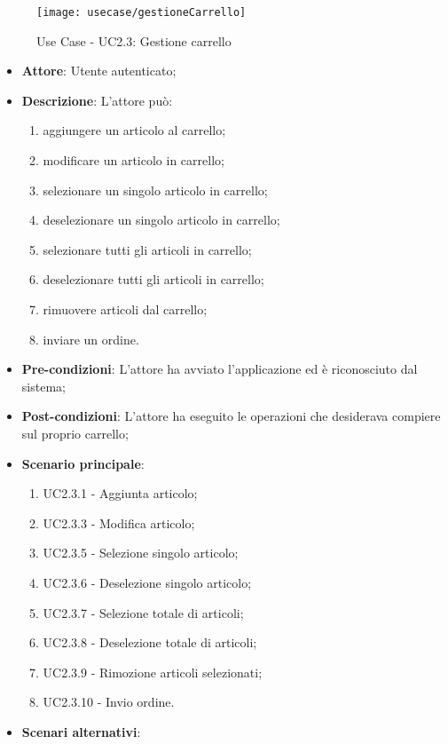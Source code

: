 \begin{figure}[!h] 
    \centering 
    \texttt{[image: usecase/gestioneCarrello]} 
    \caption{Use Case - UC2.3: Gestione carrello}
\end{figure}

\begin{itemize}
	\item \textbf{Attore}: Utente autenticato;
	\item \textbf{Descrizione}: L'attore può:
		\begin{enumerate}
			\item aggiungere un articolo al carrello;
			\item modificare un articolo in carrello;
			\item selezionare un singolo articolo in carrello;
			\item deselezionare un singolo articolo in carrello;
			\item selezionare tutti gli articoli in carrello;
			\item deselezionare tutti gli articoli in carrello;
			\item rimuovere articoli dal carrello;
			\item inviare un ordine.
		\end{enumerate}
	\item \textbf{Pre-condizioni}: L'attore ha avviato l'applicazione ed è riconosciuto dal sistema;
	\item \textbf{Post-condizioni}: L'attore ha eseguito le operazioni che desiderava compiere sul proprio carrello;
	\item \textbf{Scenario principale}:
		\begin{enumerate}
			\item UC2.3.1 - Aggiunta articolo;
			\item UC2.3.3 - Modifica articolo;
			\item UC2.3.5 - Selezione singolo articolo;
			\item UC2.3.6 - Deselezione singolo articolo;
			\item UC2.3.7 - Selezione totale di articoli;
			\item UC2.3.8 - Deselezione totale di articoli;
			\item UC2.3.9 - Rimozione articoli selezionati;
			\item UC2.3.10 - Invio ordine.
		\end{enumerate}
	\item \textbf{Scenari alternativi}:
		\begin{itemize}

\end{itemize}
\end{itemize}
